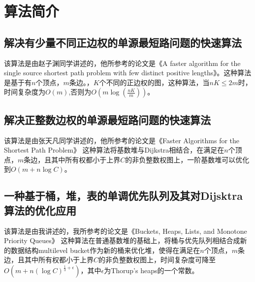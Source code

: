 
\chapter{算法简介}

\section{解决有少量不同正边权的单源最短路问题的快速算法}

该算法是由赵子渊同学讲述的，他所参考的论文是《A faster algorithm for the single source shortest path problem with few distinct positive lengths》\cite{Orlin2010A}。这种算法是基于有$n$个顶点，$m$条边。，$K$个不同的正边权的图，这种算法，当$nK\leq 2m$时，时间复杂度为$O(m)$,否则为$O(m\log (\frac{nK}{m}))$。

\section{解决正整数边权的单源最短路问题的快速算法}
该算法是由张天凡同学讲述的，他所参考的论文是《Faster Algorithms for the Shortest Path Problem》\cite{Ahuja1990Faster}
这种算法将基数堆与Dijkstra相结合，在满足在$n$个顶点，$m$条边，且其中所有权都小于上界$C$的非负整数权图上，一阶基数堆可以优化到$O(m+n\log C)$。

\section{一种基于桶，堆，表的单调优先队列及其对Dijsktra算法的优化应用}
该算法是由我讲述的，我所参考的论文是《Buckets, Heaps, Lists, and Monotone Priority Queues》\cite{Cherkassky1997Buckets}
这种算法在普通基数堆的基础上，将桶与优先队列相结合成新的数据结构multilevel bucket作为新的桶来优化堆，使得在满足在$n$个顶点，$m$条边，且其中所有权都小于上界$C$的非负整数权图上，时间复杂度可降至$O(m+n(\log C)^{\frac{1}{3}+\epsilon})$，其中$\epsilon$为Thorup's heaps\cite{Thorup1996On}的一个常数。